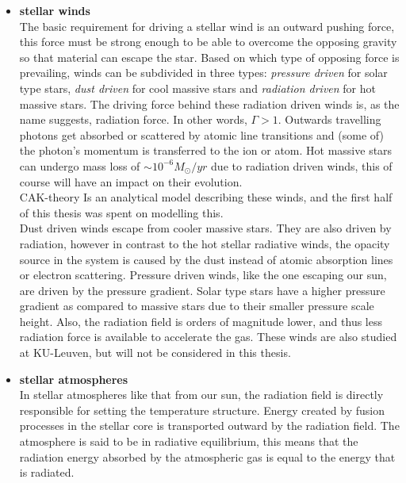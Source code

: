 \begin{itemize}
\item \textbf{stellar winds}\\
The basic requirement for driving a stellar wind is an outward pushing force, this force must be strong enough to be able to overcome the opposing gravity so that material can escape the star. Based on which type of opposing force is prevailing, winds can be subdivided in three types: \emph{pressure driven} for solar type stars, \emph{dust driven} for cool massive stars and \emph{radiation driven} for hot massive stars. The driving force behind these radiation driven winds is, as the name suggests, radiation force. In other words, $\Gamma > 1$. Outwards travelling photons get absorbed or scattered by atomic line transitions and (some of) the photon's momentum is transferred to the ion or atom. Hot massive stars can undergo mass loss of $\sim 10^{-6} M_\odot/yr$ due to radiation driven winds, this of course will have an impact on their evolution. \\
CAK-theory Is an analytical model describing these winds, and the first half of this thesis was spent on modelling this.\\
Dust driven winds escape from cooler massive stars. They are also driven by radiation, however in contrast to the hot stellar radiative winds, the opacity source in the system is caused by the dust instead of atomic absorption lines or electron scattering. Pressure driven winds, like the one escaping our sun, are driven by the pressure gradient. Solar type stars have a higher pressure gradient as compared to massive stars due to their smaller pressure scale height. Also, the radiation field is orders of magnitude lower, and thus less radiation force is available to accelerate the gas. These winds are also studied at KU-Leuven, but will not be considered in this thesis.

\item \textbf{stellar atmospheres}\\
In stellar atmospheres like that from our sun, the radiation field is directly responsible for setting the temperature structure. Energy created by fusion processes in the stellar core is transported outward by the radiation field. The atmosphere is said to be in radiative equilibrium, this means that the radiation energy absorbed by the atmospheric gas is equal to the energy that is radiated.


\end{itemize}
